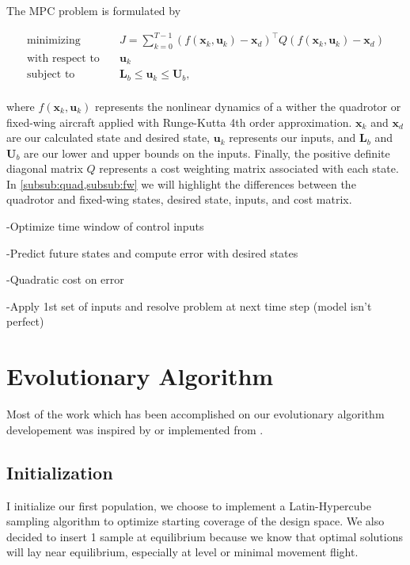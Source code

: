 \documentclass[letterpaper, 10 pt, conference]{ieeeconf}  %
\begin{document}
The MPC problem is formulated by

\begin{equation}
\label{eq:objective}
\begin{aligned}
\text{minimizing} & \quad J= \sum_{k=0}^{T-1} (f(\mathbf{x}_k,\mathbf{u}_k)-\mathbf{x}_{d})^{\top} Q (f(\mathbf{x}_k,\mathbf{u}_k)-\mathbf{x}_{d}) \\
\text{with respect to} & \quad \mathbf{u}_k  \\
\text{subject to} & \quad \mathbf{L}_b \le \mathbf{u}_k \le \mathbf{U}_b, \\
\end{aligned}
\end{equation}


where $f(\mathbf{x}_k,\mathbf{u}_k)$ represents the nonlinear dynamics of a wither the quadrotor or fixed-wing aircraft applied with Runge-Kutta 4th order approximation. $\mathbf{x}_k$ and $\mathbf{x}_{d}$ are our calculated state and desired state, $\mathbf{u}_k$ represents our inputs, and $\mathbf{L}_b$ and $\mathbf{U}_b$ are our lower and upper bounds on the inputs. Finally, the positive definite diagonal matrix $Q$ represents a cost weighting matrix associated with each state. In \cref{subsub:quad,subsub:fw} we will highlight the differences between the quadrotor and fixed-wing states, desired state, inputs, and cost matrix.

-Optimize time window of control inputs

-Predict future states and compute error with desired states

-Quadratic cost on error

-Apply 1st set of inputs and resolve problem at next time 
step (model isn't perfect)



\section{Evolutionary Algorithm}

Most of the work which has been accomplished on our evolutionary algorithm developement was inspired by or implemented from \cite{martins2017multidisciplinary}.

\subsection{Initialization}

I initialize our first population, we choose to implement a Latin-Hypercube sampling algorithm to optimize starting coverage of the design space. We also decided to insert 1 sample at equilibrium because we know that optimal solutions will lay near equilibrium, especially at level or minimal movement flight. 
\end{document}
